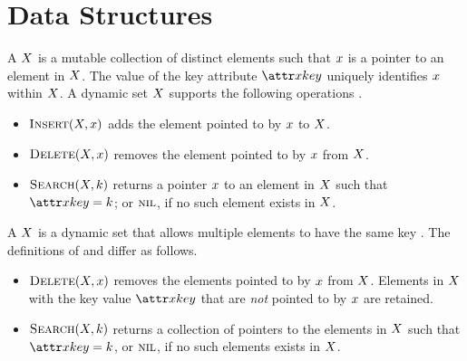 \chapter{Data Structures}\label{ch:data-structures}

A  $X$ is a mutable collection of distinct elements such that $x$ is a pointer to an element in $X$. The value of the key attribute $\aSomeElementKey$ uniquely identifies $x$ within $X$. A dynamic set $X$ supports the following operations \citep{Cormen2022}.
\begin{itemize}
  \item $\cInsert[\vSomeSet, \vSomeElement]$ adds the element pointed to by $x$ to $X$.
  \item $\cDelete[\vSomeSet, \vSomeElement]$ removes the element pointed to by $x$ from $X$.
  \item $\cSearch[\vSomeSet, \vKey]$ returns a pointer $x$ to an element in $X$ such that $\aSomeElementKey \equals \vKey$; or $\textsc{nil}$, if no such element exists in $X$.
\end{itemize}
A  $X$ is a dynamic set that allows multiple elements to have the same key \citep{Cormen2022}. The definitions of \cDelete and \cSearch differ as follows.
\begin{itemize}
  \item $\cDelete[\vSomeSet, \vSomeElement]$ removes the elements pointed to by $x$ from $X$. Elements in $X$ with the key value $\aSomeElementKey$ that are \emph{not} pointed to by $x$ are retained.
  \item $\cSearch[\vSomeSet, \vKey]$ returns a collection of pointers to the elements in $X$ such that $\aSomeElementKey \equals \vKey$, or $\textsc{nil}$, if no such elements exists in $X$.
\end{itemize}